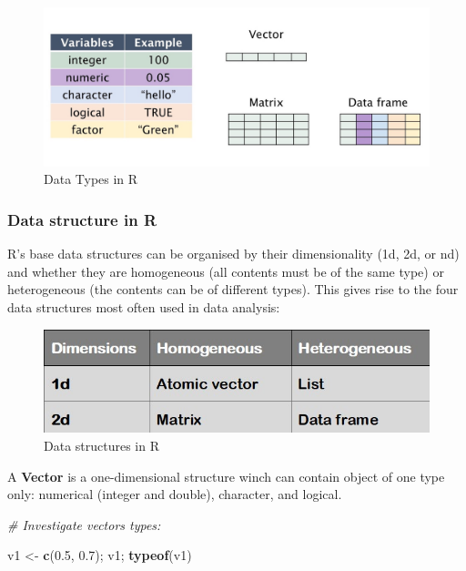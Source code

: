\documentclass[
]{article}
\newenvironment{Shaded}{\begin{snugshade}}{\end{snugshade}}
\newcommand{\CommentTok}[1]{\textcolor[rgb]{0.56,0.35,0.01}{\textit{#1}}}
\newcommand{\FloatTok}[1]{\textcolor[rgb]{0.00,0.00,0.81}{#1}}
\newcommand{\FunctionTok}[1]{\textcolor[rgb]{0.13,0.29,0.53}{\textbf{#1}}}
\newcommand{\NormalTok}[1]{#1}
\newcommand{\OtherTok}[1]{\textcolor[rgb]{0.56,0.35,0.01}{#1}}
\begin{document}
\begin{figure}

{\centering \includegraphics[width=1\linewidth,height=0.8\textheight]{images/Rvariablesdata} 

}

\caption{Data Types in R \label{data_Type}}\label{fig:img1}
\end{figure}

\subsubsection{Data structure in R}\label{data-structure-in-r}

R's base data structures can be organised by their dimensionality (1d, 2d, or nd) and whether they are homogeneous (all contents must be of the same type) or heterogeneous (the contents can be of different types).
This gives rise to the four data structures most often used in data analysis:

\begin{figure}

{\centering \includegraphics[width=0.5\linewidth,height=0.6\textheight]{images/data_type} 

}

\caption{Data structures in R \label{data_str}}\label{fig:img2}
\end{figure}

A \textbf{Vector} is a one-dimensional structure winch can contain object of one type only: numerical (integer and double), character, and logical.

\begin{Shaded}
\begin{Highlighting}[]
\CommentTok{\# Investigate vector\textquotesingle{}s types:}

\NormalTok{v1 }\OtherTok{\textless{}{-}} \FunctionTok{c}\NormalTok{(}\FloatTok{0.5}\NormalTok{, }\FloatTok{0.7}\NormalTok{); v1; }\FunctionTok{typeof}\NormalTok{(v1)}
\end{Highlighting}
\end{Shaded}
\end{document}
